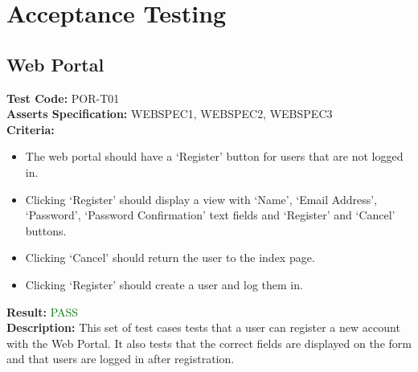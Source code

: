 \documentclass[11pt,a4paper]{report}
\begin{document}
\section{Acceptance Testing}
\label{sec:acceptance-testint}

\subsection{Web Portal}
\label{sec:webportal-acceptance-testing}

\label{test:POR-T01}
\noindent\textbf{Test Code:} POR-T01\\
\textbf{Asserts Specification:} WEBSPEC1, WEBSPEC2, WEBSPEC3 \\ 
\textbf{Criteria:} \begin{itemize}
                     \item The web portal should have a `Register' button for users that are not logged in.
                     \item Clicking `Register' should display a view with `Name', `Email Address', `Password', `Password Confirmation' text fields and `Register' and `Cancel' buttons.
                     \item Clicking `Cancel' should return the user to the index page.
                     \item Clicking `Register' should create a user and log them in.
                   \end{itemize}  
\textbf{Result:} \textcolor{green}{PASS}\\ 
\textbf{Description:} This set of test cases tests that a user can register a new account with the Web Portal. It also tests that the correct fields are displayed on the form and that users are logged in after registration.\\
\end{document}
